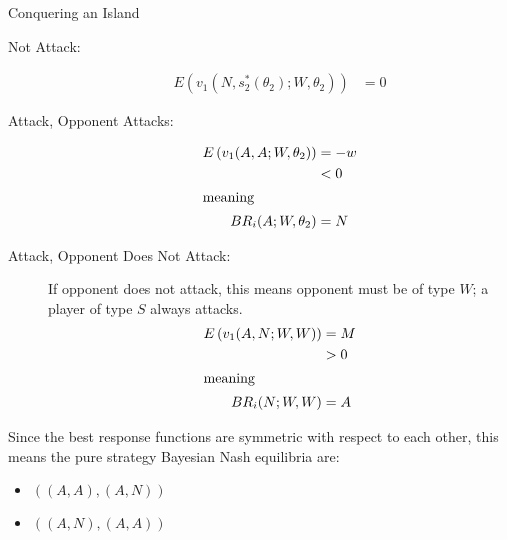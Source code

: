 \documentclass[9pt]{extarticle}
\begin{document}
\begin{problem}{Conquering an Island}
\begin{description}
        \begin{description}
          \item[Not Attack:]
            \begin{align*}
              E\left(v_1(N,s_2^{\ast}(\theta_2);W,\theta_2)\right) &= 0
            \end{align*}
          \item[Attack, Opponent Attacks:]
            \begin{align*}
              E\left(v_1(A,A;W,\theta_2)\right) &= -w\\
                                                &< 0\\
                                                \shortintertext{meaning}
              BR_i(A;W,\theta_2) &= N
            \end{align*}
          \item[Attack, Opponent Does Not Attack:]
            If opponent does not attack, this means opponent must be of type $W$; a player of type $S$ always attacks.
            \begin{align*}
              E\left(v_1(A,N;W,W)\right) &= M\\
                                         &> 0\\
                                         \shortintertext{meaning}
              BR_i(N; W,W) &= A
            \end{align*}
        \end{description}
    \end{description}
    Since the best response functions are symmetric with respect to each other, this means the pure strategy Bayesian Nash equilibria are:
    \begin{itemize}
      \item $((A,A),(A,N))$
      \item $((A,N),(A,A))$
    \end{itemize}
  \end{problem}
\end{document}
